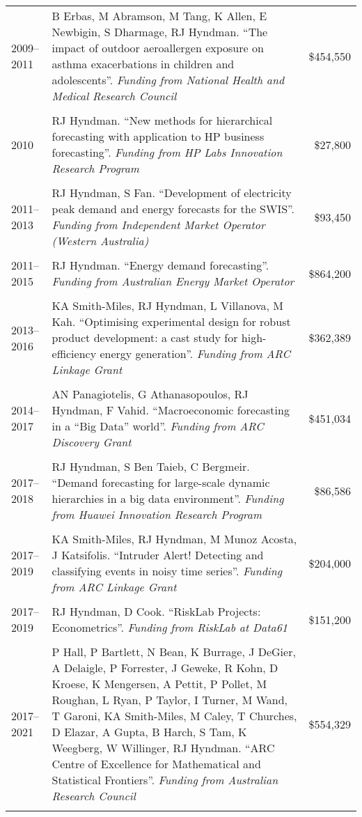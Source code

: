 \documentclass[10pt,a4paper,]{article}
\begin{document}
\begin{tabular}{lp{13.3cm}r}
   \\[-0.2cm]2009--2011 & B Erbas, M Abramson, M Tang, K Allen, E Newbigin, S Dharmage, RJ Hyndman. ``The impact of outdoor aeroallergen exposure on asthma exacerbations in children and adolescents''. \emph{Funding from National Health and Medical Research Council} & \$454,550 \\ 
   \\[-0.2cm]2010 & RJ Hyndman. ``New methods for hierarchical forecasting with application to HP business forecasting''. \emph{Funding from HP Labs Innovation Research Program} & \$27,800 \\ 
   \\[-0.2cm]2011--2013 & RJ Hyndman, S Fan. ``Development of electricity peak demand and energy forecasts for the SWIS''. \emph{Funding from Independent Market Operator (Western Australia)} & \$93,450 \\ 
   \\[-0.2cm]2011--2015 & RJ Hyndman. ``Energy demand forecasting''. \emph{Funding from Australian Energy Market Operator} & \$864,200 \\ 
   \\[-0.2cm]2013--2016 & KA Smith-Miles, RJ Hyndman, L Villanova, M Kah. ``Optimising experimental design for robust product development: a cast study for high-efficiency energy generation''. \emph{Funding from ARC Linkage Grant} & \$362,389 \\ 
   \\[-0.2cm]2014--2017 & AN Panagiotelis, G Athanasopoulos, RJ Hyndman, F Vahid. ``Macroeconomic forecasting in a “Big Data” world''. \emph{Funding from ARC Discovery Grant} & \$451,034 \\ 
   \\[-0.2cm]2017--2018 & RJ Hyndman, S Ben Taieb, C Bergmeir. ``Demand forecasting for large-scale dynamic hierarchies in a big data environment''. \emph{Funding from Huawei Innovation Research Program} & \$86,586 \\ 
   \\[-0.2cm]2017--2019 & KA Smith-Miles, RJ Hyndman, M Munoz Acosta, J Katsifolis. ``Intruder Alert! Detecting and classifying events in noisy time series''. \emph{Funding from ARC Linkage Grant} & \$204,000 \\ 
   \\[-0.2cm]2017--2019 & RJ Hyndman, D Cook. ``RiskLab Projects: Econometrics''. \emph{Funding from RiskLab at Data61} & \$151,200 \\ 
   \\[-0.2cm]2017--2021 & P Hall, P Bartlett, N Bean, K Burrage, J DeGier, A Delaigle, P Forrester, J Geweke, R Kohn, D Kroese, K Mengersen, A Pettit, P Pollet, M Roughan, L Ryan, P Taylor, I Turner, M Wand, T Garoni, KA Smith-Miles, M Caley, T Churches, D Elazar, A Gupta, B Harch, S Tam, K Weegberg, W Willinger, RJ Hyndman. ``ARC Centre of Excellence for Mathematical and Statistical Frontiers''. \emph{Funding from Australian Research Council} & \$554,329 \\ 
   \\[-0.2cm] \hline
\end{tabular}
\endgroup
\end{document}
